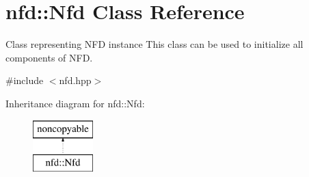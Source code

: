 \hypertarget{classnfd_1_1Nfd}{}\section{nfd\+:\+:Nfd Class Reference}
\label{classnfd_1_1Nfd}


Class representing N\+FD instance This class can be used to initialize all components of N\+FD.  




{\ttfamily \#include $<$nfd.\+hpp$>$}

Inheritance diagram for nfd\+:\+:Nfd\+:\begin{figure}[H]
\begin{center}
\leavevmode
\includegraphics[height=2.000000cm]{classnfd_1_1Nfd}
\end{center}
\end{figure}
